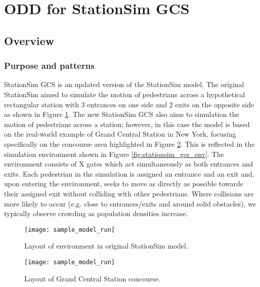 \section{ODD for StationSim GCS}
\label{sec:stationsim}

\subsection{Overview}
\label{sub:stationsim:overview}

\subsubsection{Purpose and patterns}
\label{subs:stationsim:overview:purpose}

StationSim GCS is an updated version of the StationSim model.
The original StationSim aimed to simulate the motion of pedestrians across a
hypothetical rectangular station with 3 entrances on one side and 2 exits on the
opposite side as shown in Figure \ref{fig:stationsim_env}.
The new StationSim GCS also aims to simulation the motion of pedestrians across
a station; however, in this case the model is based on the real-world example of
Grand Central Station in New York, focusing specifically on the concourse area
highlighted in Figure \ref{fig:gcs_concourse}.
This is reflected in the simulation environment shown in Figure
\ref{fig:stationsim_gcs_env}.
The environment consists of X gates which act simultaneously as both entrances
and exits.
Each pedestrian in the simulation is assigned an entrance and an exit and, upon
entering the environment, seeks to move as directly as possible towards their
assigned exit without colliding with other pedestrians.
Where collisions are more likely to occur (e.g. close to entrances/exits and
around solid obstacles), we typically observe crowding as population densities
increase.

\begin{figure}[h]
    \centering
    \texttt{[image: sample\_model\_run]}
    \caption{Layout of environment in original StationSim model.}
    \label{fig:stationsim_env}
\end{figure}

\begin{figure}[h]
    \centering
    \texttt{[image: sample\_model\_run]}
    \caption{Layout of Grand Central Station concourse.}
    \label{fig:gcs_concourse}
\end{figure}

